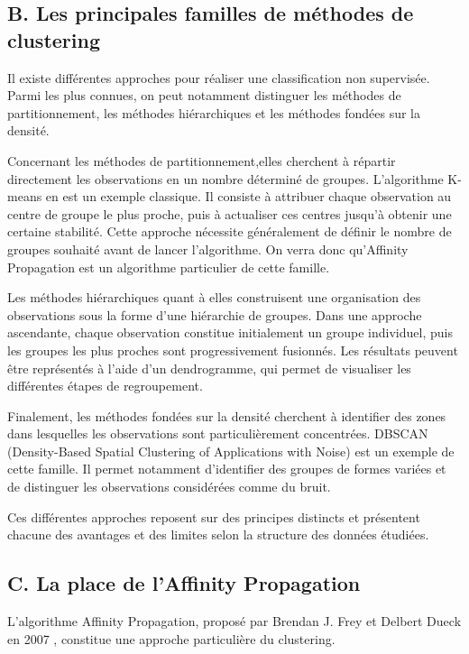 \documentclass[11pt,a4paper]{memoirerecherche}
\begin{document}
\subsection{B. Les principales familles de méthodes de
clustering}\label{b.-les-principales-familles-de-muxe9thodes-de-clustering}

Il existe différentes approches pour réaliser une classification non
supervisée. Parmi les plus connues, on peut notamment distinguer les
méthodes de partitionnement, les méthodes hiérarchiques et les méthodes
fondées sur la densité.

Concernant les méthodes de partitionnement,elles cherchent à répartir
directement les observations en un nombre déterminé de groupes.
L'algorithme K-means en est un exemple classique. Il consiste à
attribuer chaque observation au centre de groupe le plus proche, puis à
actualiser ces centres jusqu'à obtenir une certaine stabilité. Cette
approche nécessite généralement de définir le nombre de groupes souhaité
avant de lancer l'algorithme. On verra donc qu'Affinity Propagation est
un algorithme particulier de cette famille.

Les méthodes hiérarchiques quant à elles construisent une organisation
des observations sous la forme d'une hiérarchie de groupes. Dans une
approche ascendante, chaque observation constitue initialement un groupe
individuel, puis les groupes les plus proches sont progressivement
fusionnés. Les résultats peuvent être représentés à l'aide d'un
dendrogramme, qui permet de visualiser les différentes étapes de
regroupement.

Finalement, les méthodes fondées sur la densité cherchent à identifier
des zones dans lesquelles les observations sont particulièrement
concentrées. DBSCAN (Density-Based Spatial Clustering of Applications
with Noise) est un exemple de cette famille. Il permet notamment
d'identifier des groupes de formes variées et de distinguer les
observations considérées comme du bruit.

Ces différentes approches reposent sur des principes distincts et
présentent chacune des avantages et des limites selon la structure des
données étudiées.

\subsection{C. La place de l'Affinity
Propagation}\label{c.-la-place-de-laffinity-propagation}

L'algorithme Affinity Propagation, proposé par Brendan J. Frey et
Delbert Dueck en 2007 \autocite{frey2007clustering}, constitue une
approche particulière du clustering.
\end{document}

